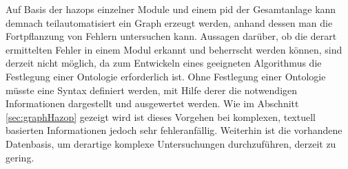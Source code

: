 Auf Basis der \acp{hazop} einzelner Module und einem \ac{pid} der Gesamtanlage kann demnach teilautomatisiert ein Graph erzeugt werden, anhand dessen man die Fortpflanzung von Fehlern untersuchen kann. Aussagen dar\"uber, ob die derart ermittelten Fehler in einem Modul erkannt und beherrscht werden k\"onnen, sind derzeit nicht m\"oglich, da zum Entwickeln eines geeigneten Algorithmus die Festlegung einer Ontologie erforderlich ist. Ohne Festlegung einer Ontologie m\"usste eine Syntax definiert werden, mit Hilfe derer die notwendigen Informationen dargestellt und ausgewertet werden. Wie im Abschnitt \ref{sec:graphHazop} gezeigt wird ist dieses Vorgehen bei komplexen, textuell basierten Informationen jedoch sehr fehleranf\"allig. Weiterhin ist die vorhandene Datenbasis, um derartige komplexe Untersuchungen durchzuf\"uhren, derzeit zu gering.
